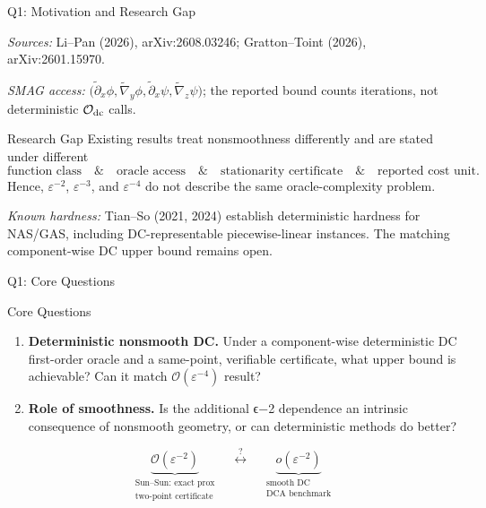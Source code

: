 \documentclass[10pt]{beamer}
\begin{document}
\begin{frame}{Q1: Motivation and Research Gap}
\vspace{0.4mm}
{\tiny\textit{Sources:} Li--Pan (2026), arXiv:2608.03246; Gratton--Toint
(2026), arXiv:2601.15970.\par}
\vspace{0.4mm}
{\tiny
\textit{SMAG access: }
$\bigl(\widetilde{\partial}_x\phi,\widetilde{\nabla}_y\phi,
\widetilde{\partial}_x\psi,\widetilde{\nabla}_z\psi\bigr)$;
the reported bound counts iterations, not deterministic
$\mathcal O_{\rm dc}$ calls.\par}

\vspace{1mm}
\begin{block}{Research Gap}
Existing results treat nonsmoothness differently and are stated under different
\[
\text{function class}
\quad\&\quad
\text{oracle access}
\quad\&\quad
\text{stationarity certificate}
\quad\&\quad
\text{reported cost unit}.
\]
Hence, $\varepsilon^{-2}$, $\varepsilon^{-3}$, and
$\varepsilon^{-4}$ do not describe the same oracle-complexity problem.

\vspace{0.3mm}
{\tiny
\textit{Known hardness:} Tian--So (2021, 2024) establish deterministic
hardness for NAS/GAS, including DC-representable piecewise-linear
instances. The matching component-wise DC upper bound remains open.\par}
\end{block}
\end{frame}

\begin{frame}{Q1: Core Questions}

\begin{block}{Core Questions}
\begin{enumerate}\setlength{\itemsep}{3pt}
\item \textbf{Deterministic nonsmooth DC.}
Under a component-wise deterministic DC first-order oracle and a
same-point, verifiable certificate, what upper bound is achievable?
Can it match $\mathcal O(\varepsilon^{-4})$ result?

\item \textbf{Role of smoothness.}
Is the additional ϵ−2 dependence an intrinsic consequence of nonsmooth geometry,
or can deterministic methods do better?
\end{enumerate}

\[
\underbrace{\mathcal O(\varepsilon^{-2})}_{\substack{\text{Sun--Sun: exact prox}\\
\text{two-point certificate}}}
\quad\stackrel{?}{\longleftrightarrow}\quad
\underbrace{o(\varepsilon^{-2})}_{\substack{\text{smooth DC}\\
\text{DCA benchmark}}}
\]
\end{block}

\end{frame}
\end{document}
